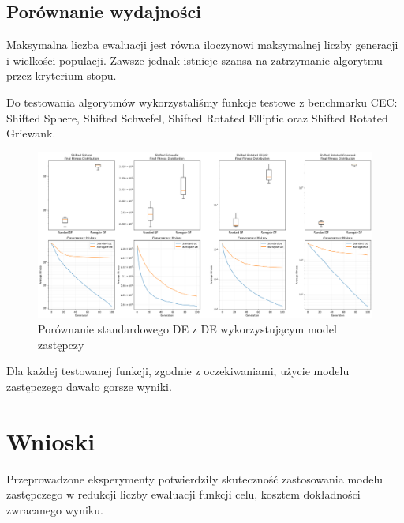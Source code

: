 \documentclass{article}
\begin{document}





\subsection{Porównanie wydajności}

Maksymalna liczba ewaluacji jest równa iloczynowi maksymalnej liczby generacji i wielkości populacji. Zawsze jednak istnieje szansa na zatrzymanie algorytmu przez kryterium stopu.  

Do testowania algorytmów wykorzystaliśmy funkcje testowe z benchmarku CEC: Shifted Sphere, Shifted Schwefel, Shifted Rotated Elliptic oraz Shifted Rotated Griewank.

\begin{figure}[H]
    \centering
    \includegraphics[width=\textwidth]{comprehensive_results.png}
    \caption{Porównanie standardowego DE z DE wykorzystującym model zastępczy}
    \label{fig:comprehensive_results}
\end{figure}

Dla każdej testowanej funkcji, zgodnie z oczekiwaniami, użycie modelu zastępczego dawało gorsze wyniki.

\section{Wnioski}
Przeprowadzone eksperymenty potwierdziły skuteczność zastosowania modelu zastępczego w redukcji liczby ewaluacji funkcji celu, kosztem dokładności zwracanego wyniku.
\end{document}
